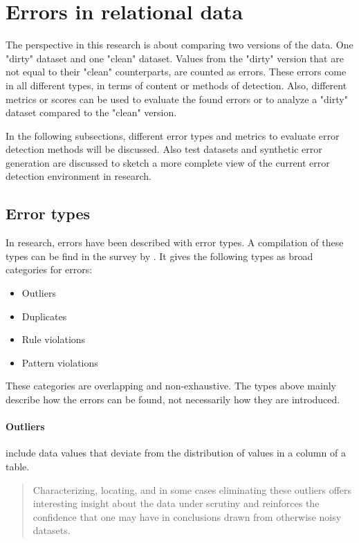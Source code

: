 \section{Errors in relational data}
The perspective in this research is about comparing two versions of the data. One "dirty" dataset and one "clean" dataset. Values from the "dirty" version that are not equal to their "clean" counterparts, are counted as errors. These errors come in all different types, in terms of content or methods of detection. Also, different metrics or scores can be used to evaluate the found errors or to analyze a "dirty" dataset compared to the "clean" version.
 
In the following subsections, different error types and metrics to evaluate error detection methods will be discussed. Also test datasets and synthetic error generation are discussed to sketch a more complete view of the current error detection environment in research.

\subsection{Error types}
\label{subsec:errortypes}
In research, errors have been described with error types. A compilation of these types can be find in the survey by \cite{Abedjan2016-jc}. It gives the following types as broad categories for errors:
\begin{itemize}
    \item Outliers
    \item Duplicates
    \item Rule violations
    \item Pattern violations
\end{itemize}

These categories are overlapping and non-exhaustive. The types above mainly describe how the errors can be found, not necessarily how they are introduced. 

\paragraph{Outliers} include data values that deviate from the distribution of values in a column of a table.
\blockquote{Characterizing,
locating, and in some cases eliminating these outliers offers
interesting insight about the data under scrutiny and reinforces
the confidence that one may have in conclusions drawn from
otherwise noisy datasets. \cite{Pit--Claudel2016-dj}}. 

